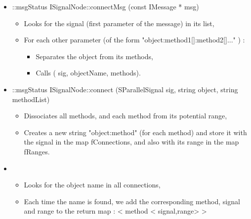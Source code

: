 \documentclass[a4paper]{article}
\begin{document}
\begin{itemize}
  \item {::{\color{ForestGreen}msgStatus ISignalNode}::connectMsg ({\color{VioletRed}const} {\color{ForestGreen}IMessage} * msg)}
  \begin{itemize}
    \item Looks for the signal (first parameter of the message) in its list,
    \item For each other parameter (of the form "{\asciifamily object:method1[]:method2[]}..." ) : 
    \begin{itemize}
      \item Separates the object from its methods,
      \item Calls { ( sig, objectName, methods)}.
    \end{itemize}
  \end{itemize}
  
  \item {::{\color{ForestGreen}msgStatus} {\color{ForestGreen}ISignalNode}::connect ({\color{ForestGreen}SParallelSignal} sig, {\color{Violet}string} object, {\color{Violet}string} methodList)}
  \begin{itemize}
    \item Dissociates all methods, and each method from its potential range,
    \item Creates a new string "{\asciifamily object:method}" (for each method) and store it with the signal in the map {\asciifamily \color{ForestGreen}fConnections}, and also with its range in the map {\asciifamily \color{ForestGreen}fRanges}.
  \end{itemize}
  
  \item {}
  \begin{itemize}
    \item Looks for the object name in all connections,
    \item Each time the name is found, we add the corresponding method, signal and range to the return map : {\asciifamily < method < signal,range> >}
  \end{itemize}
\end{itemize}
\end{document}
